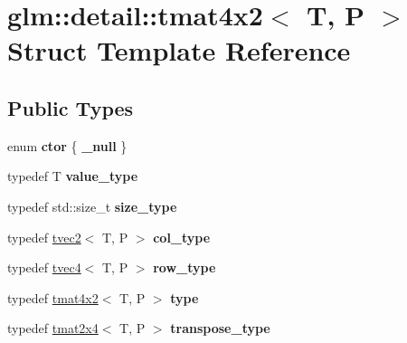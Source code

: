 \hypertarget{structglm_1_1detail_1_1tmat4x2}{\section{glm\-:\-:detail\-:\-:tmat4x2$<$ T, P $>$ Struct Template Reference}
\label{structglm_1_1detail_1_1tmat4x2}
}
\subsection*{Public Types}
\begin{DoxyCompactItemize}
\item 
enum {\bfseries ctor} \{ {\bfseries \-\_\-null}
 \}
\item 
\hypertarget{structglm_1_1detail_1_1tmat4x2_a69ee68b76c63d5e19001223eb5e7e968}{typedef T {\bfseries value\-\_\-type}}\label{structglm_1_1detail_1_1tmat4x2_a69ee68b76c63d5e19001223eb5e7e968}

\item 
\hypertarget{structglm_1_1detail_1_1tmat4x2_aaf03e298b1377068358fc09cdfcd889a}{typedef std\-::size\-\_\-t {\bfseries size\-\_\-type}}\label{structglm_1_1detail_1_1tmat4x2_aaf03e298b1377068358fc09cdfcd889a}

\item 
\hypertarget{structglm_1_1detail_1_1tmat4x2_a7ff0997d9fa4f93eba8a6530ca2cd3f7}{typedef \hyperlink{structglm_1_1detail_1_1tvec2}{tvec2}$<$ T, P $>$ {\bfseries col\-\_\-type}}\label{structglm_1_1detail_1_1tmat4x2_a7ff0997d9fa4f93eba8a6530ca2cd3f7}

\item 
\hypertarget{structglm_1_1detail_1_1tmat4x2_a7800d3c9fae6e2e47ba71cac323aafcf}{typedef \hyperlink{structglm_1_1detail_1_1tvec4}{tvec4}$<$ T, P $>$ {\bfseries row\-\_\-type}}\label{structglm_1_1detail_1_1tmat4x2_a7800d3c9fae6e2e47ba71cac323aafcf}

\item 
\hypertarget{structglm_1_1detail_1_1tmat4x2_a0906a5a3d185ed08196fd6657436eb56}{typedef \hyperlink{structglm_1_1detail_1_1tmat4x2}{tmat4x2}$<$ T, P $>$ {\bfseries type}}\label{structglm_1_1detail_1_1tmat4x2_a0906a5a3d185ed08196fd6657436eb56}

\item 
\hypertarget{structglm_1_1detail_1_1tmat4x2_a2093723021c90d6591afa09a5c8a0bdf}{typedef \hyperlink{structglm_1_1detail_1_1tmat2x4}{tmat2x4}$<$ T, P $>$ {\bfseries transpose\-\_\-type}}\label{structglm_1_1detail_1_1tmat4x2_a2093723021c90d6591afa09a5c8a0bdf}

\end{DoxyCompactItemize}
